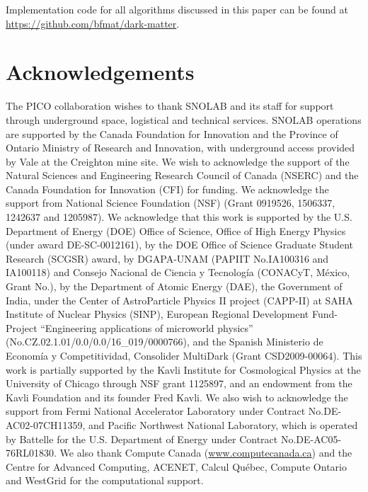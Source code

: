 \documentclass[10pt]{article}
\begin{document}
Implementation code for all algorithms discussed in this paper can be found at \url{https://github.com/bfmat/dark-matter}.

\section{Acknowledgements}

The PICO collaboration wishes to thank SNOLAB and its staff for support through underground space, logistical and technical services. SNOLAB operations are supported by the Canada Foundation for Innovation and the Province of Ontario Ministry of Research and Innovation, with underground access provided by Vale at the Creighton mine site. We wish to acknowledge the support of the Natural Sciences and Engineering Research Council of Canada (NSERC) and the Canada Foundation for Innovation (CFI) for funding. We acknowledge the support from National Science Foundation (NSF) (Grant 0919526, 1506337, 1242637 and 1205987). We acknowledge that this work is supported by the U.S. Department of Energy (DOE) Office of Science, Office of High Energy Physics (under award DE-SC-0012161), by the DOE Office of Science Graduate Student Research (SCGSR) award,  by DGAPA-UNAM (PAPIIT No.\:IA100316 and IA100118) and Consejo Nacional de Ciencia y Tecnolog\'ia (CONACyT, M\'exico, Grant No.), by the Department of Atomic Energy (DAE), the Government of India, under the Center of AstroParticle Physics II project (CAPP-II) at SAHA Institute of Nuclear Physics (SINP), European Regional Development Fund-Project ``Engineering applications of microworld physics'' (No.\:CZ.02.1.01/0.0/0.0/16\_019/0000766), and the Spanish Ministerio de Econom\'ia y Competitividad, Consolider MultiDark (Grant CSD2009-00064). This work is partially supported by the Kavli Institute for Cosmological Physics at the University of Chicago through NSF grant 1125897, and an endowment from the Kavli Foundation and its founder Fred Kavli. We also wish to acknowledge the support from Fermi National Accelerator Laboratory under Contract No.\:DE-AC02-07CH11359, and Pacific Northwest National Laboratory, which is operated by Battelle for the U.S. Department of Energy under Contract No.\:DE-AC05-76RL01830. We also thank Compute Canada (\url{www.computecanada.ca}) and the Centre for Advanced Computing, ACENET, Calcul Qu\'ebec, Compute Ontario and WestGrid for the computational support.

\printbibliography
\end{document}

